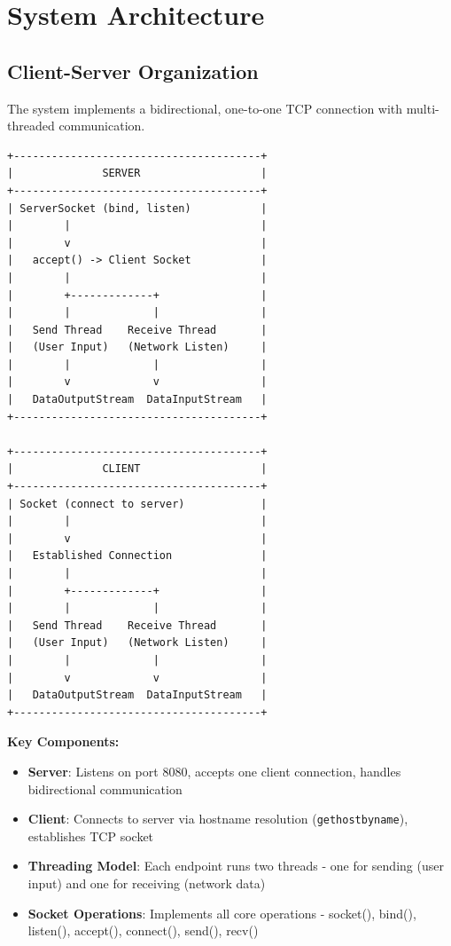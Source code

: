 \documentclass[12pt, letterpaper]{article}
\begin{document}
\section{System Architecture}

\subsection{Client-Server Organization}
The system implements a bidirectional, one-to-one TCP connection with multi-threaded communication.

\begin{verbatim}
+---------------------------------------+
|              SERVER                   |
+---------------------------------------+
| ServerSocket (bind, listen)           |
|        |                              |
|        v                              |
|   accept() -> Client Socket           |
|        |                              |
|        +-------------+                |
|        |             |                |
|   Send Thread    Receive Thread       |
|   (User Input)   (Network Listen)     |
|        |             |                |
|        v             v                |
|   DataOutputStream  DataInputStream   |
+---------------------------------------+

+---------------------------------------+
|              CLIENT                   |
+---------------------------------------+
| Socket (connect to server)            |
|        |                              |
|        v                              |
|   Established Connection              |
|        |                              |
|        +-------------+                |
|        |             |                |
|   Send Thread    Receive Thread       |
|   (User Input)   (Network Listen)     |
|        |             |                |
|        v             v                |
|   DataOutputStream  DataInputStream   |
+---------------------------------------+
\end{verbatim}

\textbf{Key Components:}
\begin{itemize}
    \item \textbf{Server}: Listens on port 8080, accepts one client connection, handles bidirectional communication
    \item \textbf{Client}: Connects to server via hostname resolution (\texttt{gethostbyname}), establishes TCP socket
    \item \textbf{Threading Model}: Each endpoint runs two threads - one for sending (user input) and one for receiving (network data)
    \item \textbf{Socket Operations}: Implements all core operations - socket(), bind(), listen(), accept(), connect(), send(), recv()
\end{itemize}
\end{document}
